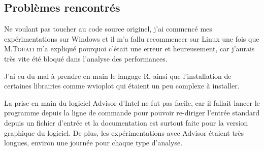 \documentclass[
 aip,
 jmp,
 amsmath,amssymb,
 reprint
]{revtex4-1}
\begin{document}
\subsection{Problèmes rencontrés}
Ne voulant pas toucher au code source originel, j'ai commencé mes expérimentations sur Windows et il m'a fallu recommencer sur Linux une fois que M.\textsc{Touati} m'a expliqué pourquoi c'était une erreur et heureusement, car j'aurais très vite été bloqué dans l'analyse des performances.\par
J'ai eu du mal à prendre en main le langage R, ainsi que l'installation de certaines librairies comme wvioplot qui étaient un peu complexe à installer.\par
La prise en main du logiciel Advisor d'Intel ne fut pas facile, car il fallait lancer le programme depuis la ligne de commande pour pouvoir re-diriger l'entrée standard depuis un fichier d'entrée et la documentation est surtout faite pour la version graphique du logiciel. De plus, les expérimentations avec Advisor étaient très longues, environ une journée pour chaque type d'analyse.
\clearpage
\end{document}
